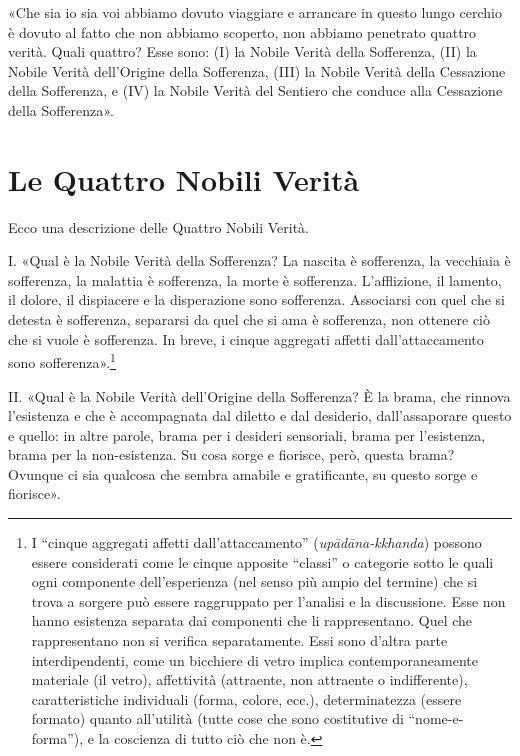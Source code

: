 

«Che sia io sia voi abbiamo dovuto viaggiare e arrancare in questo lungo
cerchio è dovuto al fatto che non abbiamo scoperto, non abbiamo
penetrato quattro verità. Quali quattro? Esse sono: (I) la Nobile Verità
della Sofferenza, (II) la Nobile Verità dell’Origine della Sofferenza,
(III) la Nobile Verità della Cessazione della Sofferenza, e (IV) la
Nobile Verità del Sentiero che conduce alla Cessazione della
Sofferenza».




\hypertarget{x-le-quattro-nobili-verità}{\section*{Le Quattro Nobili Verità}}
 Ecco una descrizione delle Quattro Nobili Verità.


 I. «Qual è la Nobile Verità della Sofferenza? La nascita è
sofferenza, la vecchiaia è sofferenza, la malattia è sofferenza, la
morte è sofferenza. L’afflizione, il lamento, il dolore, il dispiacere e
la disperazione sono sofferenza. Associarsi con quel che si detesta è
sofferenza, separarsi da quel che si ama è sofferenza, non ottenere ciò
che si vuole è sofferenza. In breve, i cinque aggregati affetti
dall’attaccamento sono sofferenza».\footnote{I “cinque aggregati affetti dall’attaccamento” (\emph{upādāna-kkhanda}) possono essere considerati come le cinque apposite “classi” o categorie sotto le quali ogni componente dell’esperienza (nel senso più ampio del termine) che si trova a sorgere può essere raggruppato per l’analisi e la discussione. Esse non hanno esistenza separata dai componenti che li rappresentano. Quel che rappresentano non si verifica separatamente. Essi sono d’altra parte interdipendenti, come un bicchiere di vetro implica contemporaneamente materiale (il vetro), affettività (attraente, non attraente o indifferente), caratteristiche individuali (forma, colore, ecc.), determinatezza (essere formato) quanto all’utilità (tutte cose che sono costitutive di “nome-e-forma”), e la coscienza di tutto ciò che non è.}




II. «Qual è la Nobile Verità dell’Origine della Sofferenza? È la brama,
che rinnova l’esistenza e che è accompagnata dal diletto e dal
desiderio, dall’assaporare questo e quello: in altre parole, brama per i
desideri sensoriali, brama per l’esistenza, brama per la non-esistenza.
Su cosa sorge e fiorisce, però, questa brama? Ovunque ci sia qualcosa
che sembra amabile e gratificante, su questo sorge e fiorisce».


